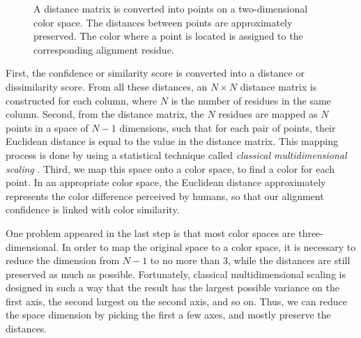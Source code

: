 \begin{figure}[hbt]
\caption[Conversion from Distance Matrix into Colors]{A distance matrix is converted into points on a two-dimensional color space. The distances between points are approximately preserved. The color where a point is located is assigned to the corresponding alignment residue.}\label{fig:chap2_color}
\end{figure}

First, the confidence or similarity score is converted into a distance or dissimilarity score. From all these distances, an $N \times N$ distance matrix is constructed for each column, where $N$ is the number of residues in the same column. Second, from the distance matrix, the $N$ residues are mapped as $N$ points in a space of $N-1$ dimensions, such that for each pair of points, their Euclidean distance is equal to the value in the distance matrix. This mapping process is done by using a statistical technique called \emph{classical multidimensional scaling} \cite{Borg:1997aa}. Third, we map this space onto a color space, to find a color for each point. In an appropriate color space, the Euclidean distance approximately represents the color difference perceived by humans, so that our alignment confidence is linked with color similarity.

One problem appeared in the last step is that most color spaces are three-dimensional. In order to map the original space to a color space, it is necessary to reduce the dimension from $N-1$ to no more than 3, while the distances are still preserved as much as possible. Fortunately, classical multidimensional scaling is designed in such a way that the result has the largest possible variance on the first axis, the second largest on the second axis, and so on. Thus, we can reduce the space dimension by picking the first a few axes, and mostly preserve the distances.

